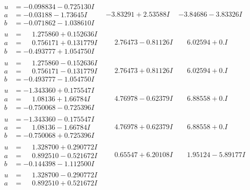 \documentclass[1p]{elsarticle_modified}
\theoremstyle{definition}
\begin{document}
$$\begin{array}{c|c|c}
\begin{aligned}
u &= -0.098834 - 0.725130 I \\
a &= -0.03188 - 1.73645 I \\
b &= -0.071862 - 1.038610 I\end{aligned}
 & -3.83291 + 2.53588 I & -3.84686 - 3.83326 I \\ \hline\begin{aligned}
u &= \phantom{-}1.275860 + 0.152636 I \\
a &= \phantom{-}0.756171 + 0.131779 I \\
b &= -0.493777 + 1.054750 I\end{aligned}
 & \phantom{-}2.76473 - 0.81126 I & \phantom{-}6.02594 + 0. I\phantom{ +0.000000I} \\ \hline\begin{aligned}
u &= \phantom{-}1.275860 - 0.152636 I \\
a &= \phantom{-}0.756171 - 0.131779 I \\
b &= -0.493777 - 1.054750 I\end{aligned}
 & \phantom{-}2.76473 + 0.81126 I & \phantom{-}6.02594 + 0. I\phantom{ +0.000000I} \\ \hline\begin{aligned}
u &= -1.343360 + 0.175547 I \\
a &= \phantom{-}1.08136 + 1.66784 I \\
b &= -0.750068 - 0.725396 I\end{aligned}
 & \phantom{-}4.76978 - 0.62379 I & \phantom{-}6.88558 + 0. I\phantom{ +0.000000I} \\ \hline\begin{aligned}
u &= -1.343360 - 0.175547 I \\
a &= \phantom{-}1.08136 - 1.66784 I \\
b &= -0.750068 + 0.725396 I\end{aligned}
 & \phantom{-}4.76978 + 0.62379 I & \phantom{-}6.88558 + 0. I\phantom{ +0.000000I} \\ \hline\begin{aligned}
u &= \phantom{-}1.328700 + 0.290772 I \\
a &= \phantom{-}0.892510 - 0.521672 I \\
b &= -0.144398 - 1.112500 I\end{aligned}
 & \phantom{-}0.65547 + 6.20108 I & \phantom{-}1.95124 - 5.89177 I \\ \hline\begin{aligned}
u &= \phantom{-}1.328700 - 0.290772 I \\
a &= \phantom{-}0.892510 + 0.521672 I \\

\end{aligned}
\end{array}$$
\end{document}
